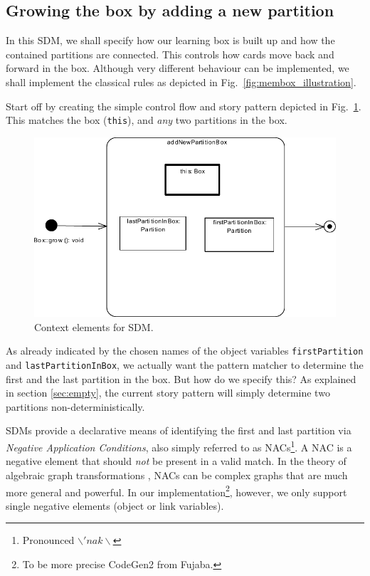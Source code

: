 \subsection{Growing the box by adding a new partition}
\label{sec:sdm_grow}	
	
In this SDM, we shall specify how our learning box is built up and how the
contained partitions are connected.  This controls how cards move back and
forward in the box.  Although very different behaviour can be implemented, we
shall implement the classical rules as depicted in
Fig.~\ref{fig:membox_illustration}.

Start off by creating the simple control flow and story pattern depicted in
Fig.~\ref{fig:sdm_grow_1}.  This matches the box (\texttt{this}), and
\emph{any} two partitions in the box.
	
\begin{figure}[htbp]
\begin{center}
  \includegraphics[width=\textwidth]{pics/sdmBilder/grow/sdm57.pdf}
  \caption{Context elements for SDM.}  
  \label{fig:sdm_grow_1}
\end{center}
\end{figure}

As already indicated by the chosen names of the object variables
\texttt{first\-Partition} and \texttt{last\-Partition\-In\-Box}, we actually
want the pattern matcher to determine the first and the last partition in the box.
But how do we specify this?  As explained in section \ref{sec:empty}, the
current story pattern will simply determine two partitions
non-deterministically.  

SDMs provide a declarative means of identifying the first and last
partition via \emph{Negative Application Conditions}, also simply
referred to as \mbox{NACs}\footnote{Pronounced $\backslash 'nak \backslash$}.
A \mbox{NAC} is a negative element that should \emph{not} be present in a valid
match.  In the theory of algebraic graph transformations \cite{EEPT06},
\mbox{NACs} can be complex graphs that are much more general and powerful.  In
our implementation\footnote{To be more precise CodeGen2 from Fujaba.}, however,
we only support single negative elements (object or link variables).

